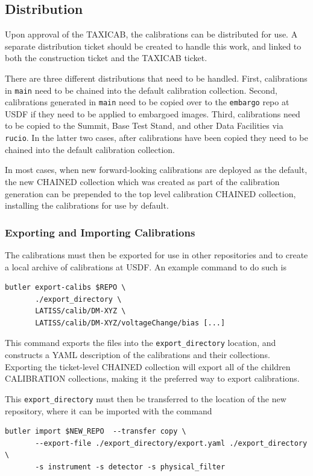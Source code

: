 \documentclass[DM,authoryear,toc]{lsstdoc}
\begin{document}
\subsection{Distribution}
\label{sec:calib_export}
Upon approval of the TAXICAB, the calibrations can be distributed for use.
A separate distribution ticket should be created to handle this work, and linked to both the construction ticket and the TAXICAB ticket.

There are three different distributions that need to be handled.
First, calibrations in \texttt{main} need to be chained into the default calibration collection.
Second, calibrations generated in \texttt{main} need to be copied over to the \texttt{embargo} repo at USDF if they need to be applied to embargoed images.
Third, calibrations need to be copied to the Summit, Base Test Stand, and other Data Facilities via \texttt{rucio}.
In the latter two cases, after calibrations have been copied they need to be chained into the default calibration collection.

In most cases, when new forward-looking calibrations are deployed as the default, the new CHAINED collection which was created as part of the calibration generation can be prepended to the top level calibration CHAINED collection, installing the calibrations for use by default.

\subsubsection{Exporting and Importing Calibrations}

The calibrations must then be exported for use in other repositories and to create a local archive of calibrations at USDF.
An example command to do such is
\begin{verbatim}
butler export-calibs $REPO \
       ./export_directory \
       LATISS/calib/DM-XYZ \
       LATISS/calib/DM-XYZ/voltageChange/bias [...]
\end{verbatim}
This command exports the files into the \verb|export_directory| location, and constructs a YAML description of the calibrations and their collections.
Exporting the ticket-level CHAINED collection will export all of the children CALIBRATION collections, making it the preferred way to export calibrations.

This \verb|export_directory| must then be transferred to the location of the new repository, where it can be imported with the command
\begin{verbatim}
butler import $NEW_REPO  --transfer copy \
       --export-file ./export_directory/export.yaml ./export_directory \
       -s instrument -s detector -s physical_filter
\end{verbatim}
\end{document}
